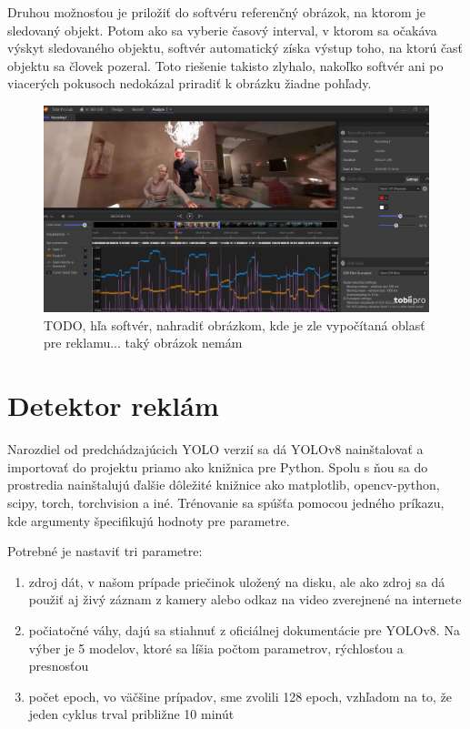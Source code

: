 Druhou možnosťou je priložiť do softvéru referenčný obrázok, na ktorom je sledovaný objekt. Potom ako sa vyberie časový interval, v ktorom sa očakáva výskyt sledovaného objektu, softvér automatický získa výstup toho, na ktorú časť objektu sa človek pozeral. Toto riešenie takisto zlyhalo, nakoľko softvér ani po viacerých pokusoch nedokázal priradiť k obrázku žiadne pohľady.
\\
\begin{figure}[ht]
    \centering
    \includegraphics[width=1\textwidth]{images/02/tobiiprolab3.jpg}
    \caption{TODO, hľa softvér, nahradiť obrázkom, kde je zle vypočítaná oblasť pre reklamu... taký obrázok nemám }
    \label{img:lab}
\end{figure}


\section{Detektor reklám}

Narozdiel od predchádzajúcich YOLO verzií sa dá YOLOv8 nainštalovať a importovať do projektu priamo ako knižnica pre Python. Spolu s ňou sa do prostredia nainštalujú ďalšie dôležité knižnice ako matplotlib, opencv-python, scipy, torch, torchvision a iné. Trénovanie sa spúšťa pomocou jedného príkazu, kde argumenty špecifikujú hodnoty pre parametre.

Potrebné je nastaviť tri parametre:

\begin{enumerate}
    \item zdroj dát,  v našom prípade priečinok uložený na disku, ale ako zdroj sa dá použiť aj živý záznam z kamery alebo odkaz na video zverejnené na internete
    \item počiatočné váhy,  dajú sa stiahnuť z oficiálnej dokumentácie pre YOLOv8. Na výber je 5 modelov, ktoré sa líšia počtom parametrov, rýchlosťou a presnosťou
    \item počet epoch, vo väčšine prípadov, sme zvolili 128 epoch, vzhľadom na to, že jeden cyklus trval približne 10 minút
\end{enumerate}

